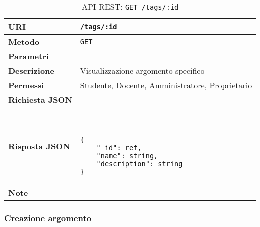         \begin{table}[H]
            \begin{center}
                \begin{tabular}{p{} p{}}
                    \toprule
                    \textbf{URI} & \texttt{/tags/:id} \\ \midrule
                    \textbf{Metodo} & \texttt{GET} \\ \midrule
                    \textbf{Parametri} & \\ \midrule
                    \textbf{Descrizione} & Visualizzazione argomento specifico \\ \midrule
                    \textbf{Permessi} & Studente, Docente, Amministratore, Proprietario  \\ \midrule
                    \textbf{Richiesta JSON} & \\ \midrule
                    \textbf{Risposta JSON} & \
                        \begin{lstlisting}[basicstyle={\ttfamily}]
{
    "_id": ref,
    "name": string,
    "description": string
}
                        \end{lstlisting}
                        \\ \midrule
                    \textbf{Note} & \\
                    \bottomrule
                \end{tabular}
                \caption{API REST: \texttt{GET /tags/:id}}
            \end{center}
        \end{table}

    \subsubsection{Creazione argomento}
    
